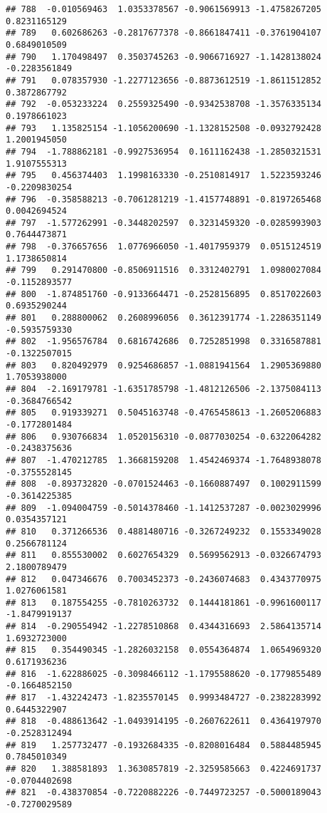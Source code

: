 \documentclass[
]{article}
\begin{document}
\begin{verbatim}
## 788  -0.010569463  1.0353378567 -0.9061569913 -1.4758267205  0.8231165129
## 789   0.602686263 -0.2817677378 -0.8661847411 -0.3761904107  0.6849010509
## 790   1.170498497  0.3503745263 -0.9066716927 -1.1428138024 -0.2283561849
## 791   0.078357930 -1.2277123656 -0.8873612519 -1.8611512852  0.3872867792
## 792  -0.053233224  0.2559325490 -0.9342538708 -1.3576335134  0.1978661023
## 793   1.135825154 -1.1056200690 -1.1328152508 -0.0932792428  1.2001945050
## 794  -1.788862181 -0.9927536954  0.1611162438 -1.2850321531  1.9107555313
## 795   0.456374403  1.1998163330 -0.2510814917  1.5223593246 -0.2209830254
## 796  -0.358588213 -0.7061281219 -1.4157748891 -0.8197265468  0.0042694524
## 797  -1.577262991 -0.3448202597  0.3231459320 -0.0285993903  0.7644473871
## 798  -0.376657656  1.0776966050 -1.4017959379  0.0515124519  1.1738650814
## 799   0.291470800 -0.8506911516  0.3312402791  1.0980027084 -0.1152893577
## 800  -1.874851760 -0.9133664471 -0.2528156895  0.8517022603  0.6935290244
## 801   0.288800062  0.2608996056  0.3612391774 -1.2286351149 -0.5935759330
## 802  -1.956576784  0.6816742686  0.7252851998  0.3316587881 -0.1322507015
## 803   0.820492979  0.9254686857 -1.0881941564  1.2905369880  1.7053938000
## 804  -2.169179781 -1.6351785798 -1.4812126506 -2.1375084113 -0.3684766542
## 805   0.919339271  0.5045163748 -0.4765458613 -1.2605206883 -0.1772801484
## 806   0.930766834  1.0520156310 -0.0877030254 -0.6322064282 -0.2438375636
## 807  -1.470212785  1.3668159208  1.4542469374 -1.7648938078 -0.3755528145
## 808  -0.893732820 -0.0701524463 -0.1660887497  0.1002911599 -0.3614225385
## 809  -1.094004759 -0.5014378460 -1.1412537287 -0.0023029996  0.0354357121
## 810   0.371266536  0.4881480716 -0.3267249232  0.1553349028  0.2566781124
## 811   0.855530002  0.6027654329  0.5699562913 -0.0326674793  2.1800789479
## 812   0.047346676  0.7003452373 -0.2436074683  0.4343770975  1.0276061581
## 813   0.187554255 -0.7810263732  0.1444181861 -0.9961600117 -1.8479919137
## 814  -0.290554942 -1.2278510868  0.4344316693  2.5864135714  1.6932723000
## 815   0.354490345 -1.2826032158  0.0554364874  1.0654969320  0.6171936236
## 816  -1.622886025 -0.3098466112 -1.1795588620 -0.1779855489 -0.1664852150
## 817  -1.432242473 -1.8235570145  0.9993484727 -0.2382283992  0.6445322907
## 818  -0.488613642 -1.0493914195 -0.2607622611  0.4364197970 -0.2528312494
## 819   1.257732477 -0.1932684335 -0.8208016484  0.5884485945  0.7845010349
## 820   1.388581893  1.3630857819 -2.3259585663  0.4224691737 -0.0704402698
## 821  -0.438370854 -0.7220882226 -0.7449723257 -0.5000189043 -0.7270029589

\end{verbatim}
\end{document}
